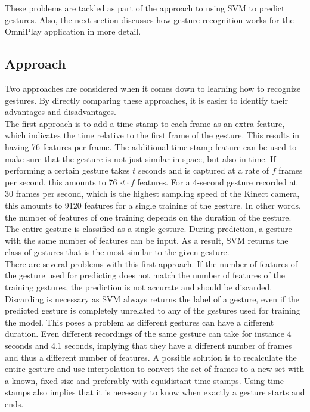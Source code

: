 These problems are tackled as part of the approach to using SVM to predict gestures. Also, the next section discusses how gesture recognition works for the OmniPlay application in more detail.


\subsection{Approach}

Two approaches are considered when it comes down to learning how to recognize gestures. By directly comparing these approaches, it is easier to identify their advantages and disadvantages.\\

The first approach is to add a time stamp to each frame as an extra feature, which indicates the time relative to the first frame of the gesture. This results in having 76 features per frame. The additional time stamp feature can be used to make sure that the gesture is not just similar in space, but also in time. If performing a certain gesture takes $t$ seconds and is captured at a rate of $f$ frames per second, this amounts to 76 $\cdot$$t \cdot f$ features. For a 4-second gesture recorded at 30 frames per second, which is the highest sampling speed of the Kinect camera, this amounts to 9120 features for a single training of the gesture. In other words, the number of features of one training depends on the duration of the gesture. The entire gesture is classified as a single gesture. During prediction, a gesture with the same number of features can be input. As a result, SVM returns the class of gestures that is the most similar to the given gesture.\\

There are several problems with this first approach. If the number of features of the gesture used for predicting does not match the number of features of the training gestures, the prediction is not accurate and should be discarded. Discarding is necessary as SVM always returns the label of a gesture, even if the predicted gesture is completely unrelated to any of the gestures used for training the model. This poses a problem as different gestures can have a different duration. Even different recordings of the same gesture can take for instance 4 seconds and 4.1 seconds, implying that they have a different number of frames and thus a different number of features. A possible solution is to recalculate the entire gesture and use interpolation to convert the set of frames to a new set with a known, fixed size and preferably with equidistant time stamps. Using time stamps also implies that it is necessary to know when exactly a gesture starts and ends.\\

